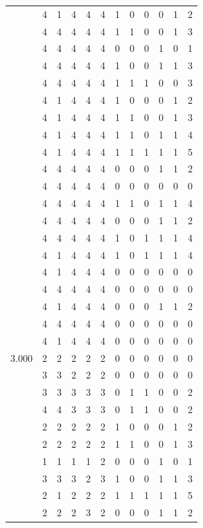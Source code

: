 \documentclass[]{book}
\theoremstyle{definition}
\theoremstyle{definition}
\theoremstyle{definition}
\theoremstyle{remark}
\begin{document}
\begin{table}
{\begin{tabular}[t]{rrrrrrrrrrrr}
 & 4 & 1 & 4 & 4 & 4 & 1 & 0 & 0 & 0 & 1 & 2\\
 & 4 & 4 & 4 & 4 & 4 & 1 & 1 & 0 & 0 & 1 & 3\\
 & 4 & 4 & 4 & 4 & 4 & 0 & 0 & 0 & 1 & 0 & 1\\
 & 4 & 4 & 4 & 4 & 4 & 1 & 0 & 0 & 1 & 1 & 3\\
 & 4 & 4 & 4 & 4 & 4 & 1 & 1 & 1 & 0 & 0 & 3\\
 & 4 & 1 & 4 & 4 & 4 & 1 & 0 & 0 & 0 & 1 & 2\\
 & 4 & 1 & 4 & 4 & 4 & 1 & 1 & 0 & 0 & 1 & 3\\
 & 4 & 1 & 4 & 4 & 4 & 1 & 1 & 0 & 1 & 1 & 4\\
 & 4 & 1 & 4 & 4 & 4 & 1 & 1 & 1 & 1 & 1 & 5\\
 & 4 & 4 & 4 & 4 & 4 & 0 & 0 & 0 & 1 & 1 & 2\\
 & 4 & 4 & 4 & 4 & 4 & 0 & 0 & 0 & 0 & 0 & 0\\
 & 4 & 4 & 4 & 4 & 4 & 1 & 1 & 0 & 1 & 1 & 4\\
 & 4 & 4 & 4 & 4 & 4 & 0 & 0 & 0 & 1 & 1 & 2\\
 & 4 & 4 & 4 & 4 & 4 & 1 & 0 & 1 & 1 & 1 & 4\\
 & 4 & 1 & 4 & 4 & 4 & 1 & 0 & 1 & 1 & 1 & 4\\
 & 4 & 1 & 4 & 4 & 4 & 0 & 0 & 0 & 0 & 0 & 0\\
 & 4 & 4 & 4 & 4 & 4 & 0 & 0 & 0 & 0 & 0 & 0\\
 & 4 & 1 & 4 & 4 & 4 & 0 & 0 & 0 & 1 & 1 & 2\\
 & 4 & 4 & 4 & 4 & 4 & 0 & 0 & 0 & 0 & 0 & 0\\
 & 4 & 1 & 4 & 4 & 4 & 0 & 0 & 0 & 0 & 0 & 0\\
3.000 & 2 & 2 & 2 & 2 & 2 & 0 & 0 & 0 & 0 & 0 & 0\\
 & 3 & 3 & 2 & 2 & 2 & 0 & 0 & 0 & 0 & 0 & 0\\
 & 3 & 3 & 3 & 3 & 3 & 0 & 1 & 1 & 0 & 0 & 2\\
 & 4 & 4 & 3 & 3 & 3 & 0 & 1 & 1 & 0 & 0 & 2\\
 & 2 & 2 & 2 & 2 & 2 & 1 & 0 & 0 & 0 & 1 & 2\\
 & 2 & 2 & 2 & 2 & 2 & 1 & 1 & 0 & 0 & 1 & 3\\
 & 1 & 1 & 1 & 1 & 2 & 0 & 0 & 0 & 1 & 0 & 1\\
 & 3 & 3 & 3 & 2 & 3 & 1 & 0 & 0 & 1 & 1 & 3\\
 & 2 & 1 & 2 & 2 & 2 & 1 & 1 & 1 & 1 & 1 & 5\\
 & 2 & 2 & 2 & 3 & 2 & 0 & 0 & 0 & 1 & 1 & 2\\

\end{tabular}}
\end{table}
\end{document}

